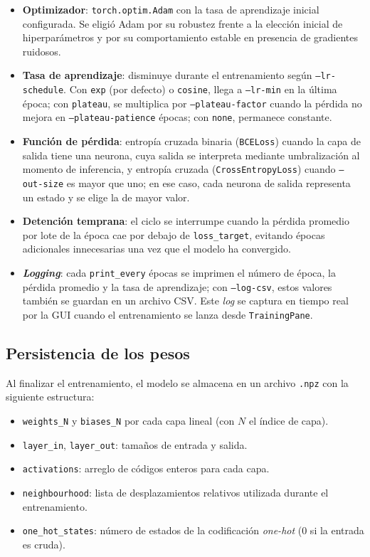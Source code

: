 \begin{itemize}
    \item \textbf{Optimizador}: \texttt{torch.optim.Adam} con la tasa de aprendizaje inicial configurada. Se eligió Adam por su robustez frente a la elección inicial de hiperparámetros y por su comportamiento estable en presencia de gradientes ruidosos.
    \item \textbf{Tasa de aprendizaje}: disminuye durante el entrenamiento según \texttt{--lr-schedule}. Con \texttt{exp} (por defecto) o \texttt{cosine}, llega a \texttt{--lr-min} en la última época; con \texttt{plateau}, se multiplica por \texttt{--plateau-factor} cuando la pérdida no mejora en \texttt{--plateau-patience} épocas; con \texttt{none}, permanece constante.
    \item \textbf{Función de pérdida}: entropía cruzada binaria (\texttt{BCELoss}) cuando la capa de salida tiene una neurona, cuya salida se interpreta mediante umbralización al momento de inferencia, y entropía cruzada (\texttt{CrossEntropyLoss}) cuando \texttt{--out-size} es mayor que uno; en ese caso, cada neurona de salida representa un estado y se elige la de mayor valor.
    \item \textbf{Detención temprana}: el ciclo se interrumpe cuando la pérdida promedio por lote de la época cae por debajo de \texttt{loss\_target}, evitando épocas adicionales innecesarias una vez que el modelo ha convergido.
    \item \textbf{\textit{Logging}}: cada \texttt{print\_every} épocas se imprimen el número de época, la pérdida promedio y la tasa de aprendizaje; con \texttt{--log-csv}, estos valores también se guardan en un archivo CSV. Este \textit{log} se captura en tiempo real por la GUI cuando el entrenamiento se lanza desde \texttt{TrainingPane}.
\end{itemize}

\subsection{Persistencia de los pesos}

Al finalizar el entrenamiento, el modelo se almacena en un archivo \texttt{.npz} con la siguiente estructura:

\begin{itemize}
    \item \texttt{weights\_N} y \texttt{biases\_N} por cada capa lineal (con $N$ el índice de capa).
    \item \texttt{layer\_in}, \texttt{layer\_out}: tamaños de entrada y salida.
    \item \texttt{activations}: arreglo de códigos enteros para cada capa.
    \item \texttt{neighbourhood}: lista de desplazamientos relativos utilizada durante el entrenamiento.
    \item \texttt{one\_hot\_states}: número de estados de la codificación \textit{one-hot} (0 si la entrada es cruda).
\end{itemize}

